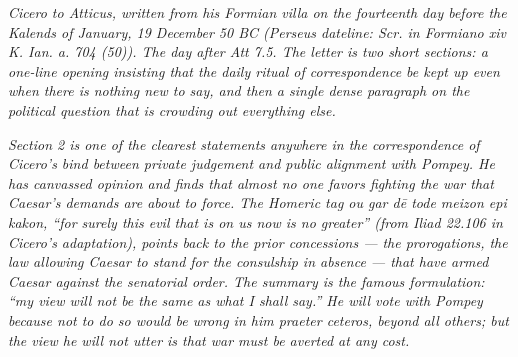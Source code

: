 
\textit{Cicero to Atticus, written from his Formian villa on
the fourteenth day before the Kalends of January, 19 December
50 BC (Perseus dateline:
\textit{Scr. in Formiano xiv K. Ian. a. 704 (50)}). The day
after Att 7.5. The letter is two short sections: a one-line
opening insisting that the daily ritual of correspondence be
kept up even when there is nothing new to say, and then a
single dense paragraph on the political question that is
crowding out everything else.}

\textit{Section 2 is one of the clearest statements anywhere
in the correspondence of Cicero's bind between private
judgement and public alignment with Pompey. He has canvassed
opinion and finds that almost no one favors fighting the war
that Caesar's demands are about to force. The Homeric tag
\emph{ou gar dē tode meizon epi kakon}, ``for surely this
evil that is on us now is no greater'' (from \emph{Iliad}
22.106 in Cicero's adaptation), points back to the prior
concessions --- the prorogations, the law allowing Caesar to
stand for the consulship in absence --- that have armed
Caesar against the senatorial order. The summary is the
famous formulation: ``my view will not be the same as what
I shall say.'' He will vote with Pompey because not to do so
would be wrong in him \emph{praeter ceteros}, beyond all
others; but the view he will not utter is that war must be
averted at any cost.}
